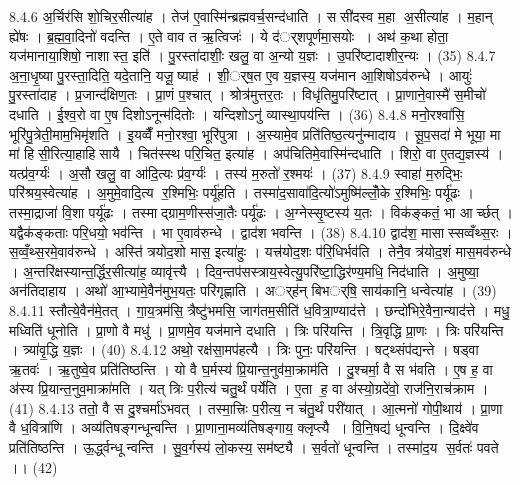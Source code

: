 8.4.6
अ॒र्चिर॑सि शो॒चिर॒सीत्या॑ह । तेज॑ ए॒वास्मि॑न्ब्रह्मवर्च॒सन्द॑धाति । ससी॑दस्व म॒हा अ॒सीत्या॑ह । म॒हान् ह्ये॑षः । ब्र॒ह्म॒वा॒दिनो॑ वदन्ति । ए॒ते वाव त ऋ॒त्विजः॑ । ये द॑र््शपूर्णमा॒सयोः । अथ॑ क॒था होता॒ यज॑मानाया॒शिषो॒ नाशास्त॒ इति॑ । पु॒रस्ता॑दाशीः॒ खलु॒ वा अ॒न्यो य॒ज्ञः । उ॒परि॑ष्टादाशीर॒न्यः । (35)
8.4.7
अ॒ना॒धृ॒ष्या पु॒रस्ता॒दिति॒ यदे॒तानि॒ यजू॒॒ष्याह॑ । शी॒र््ष॒त ए॒व य॒ज्ञस्य॒ यज॑मान आ॒शिषोऽव॑रुन्धे । आयुः॑ पु॒रस्ता॑दाह । प्र॒जान्द॑क्षिण॒तः । प्रा॒णं प॒श्चात् । श्रोत्र॑मुत्तर॒तः । विधृ॑तिमु॒परि॑ष्टात् । प्रा॒णाने॒वास्मै॑ स॒मीचो॑ दधाति । ई॒श्व॒रो वा ए॒ष दिशोऽनून्म॑दितोः । यन्दिशोऽनु॑ व्यास्था॒पय॑न्ति । (36)
8.4.8
मनो॒रश्वा॑सि॒ भूरि॑पु॒त्रेती॒माम॒भिमृ॑शति । इ॒यव्वैँ मनो॒रश्वा॒ भूरि॑पुत्रा । अ॒स्यामे॒व प्रति॑तिष्ठ॒त्यनु॑न्मादाय । सू॒प॒सदा॑ मे भूया॒ मा मा॑ हिसी॒रित्या॒हाहि॑सायै । चित॑स्स्थ परि॒चित॒ इत्या॑ह । अप॑चितिमे॒वास्मि॑न्दधाति । शिरो॒ वा ए॒तद्य॒ज्ञस्य॑ । यत्प्र॑व॒र्ग्यः॑ । अ॒सौ खलु॒ वा आ॑दि॒त्यः प्र॑व॒र्ग्यः॑ । तस्य॑ म॒रुतो॑ र॒श्मयः॑ । (37)
8.4.9
स्वाहा॑ म॒रुद्भिः॒ परि॑श्रय॒स्वेत्या॑ह । अ॒मुमे॒वादि॒त्य र॒श्मिभिः॒ पर्यू॑हति । तस्मा॑द॒सावा॑दि॒त्यो॑ऽमुष्मि॑ल्लोँ॒के र॒श्मिभिः॒ पर्यू॑ढः । तस्मा॒द्राजा॑ वि॒शा पर्यू॑ढः । तस्माद्ग्राम॒णीस्स॑जा॒तैः पर्यू॑ढः । अ॒ग्नेस्सृ॒ष्टस्य॑ य॒तः । विक॑ङ्कतं॒ भा आर्च्छत् । यद्वैक॑ङ्कताः परि॒धयो॒ भव॑न्ति । भा ए॒वाव॑रुन्धे । द्वाद॑श भवन्ति । (38)
8.4.10
द्वाद॑श॒ मासास्सव्वँथ्स॒रः । स॒व्वँ॒थ्स॒रमे॒वाव॑रुन्धे । अस्ति॑ त्रयोद॒शो मास॒ इत्या॑हुः । यत्त्र॑योद॒शः प॑रि॒धिर्भव॑ति । तेनै॒व त्र॑योद॒शं मास॒मव॑रुन्धे । अ॒न्तरि॑क्षस्यान्त॒र्द्धिर॒सीत्या॑ह॒ व्यावृ॑त्त्यै । दिव॒न्तप॑सस्त्राय॒स्वेत्यु॒परि॑ष्टा॒द्धिर॑ण्य॒मधि॒ निद॑धाति । अ॒मुष्या॒ अन॑तिदाहाय । अथो॑ आ॒भ्यामे॒वैन॑मुभ॒यतः॒ परि॑गृह्णाति । अर््ह॑न् बिभर््षि॒ साय॑कानि॒ धन्वेत्या॑ह । (39)
8.4.11
स्तौत्ये॒वैन॑मे॒तत् । गा॒य॒त्रम॑सि॒ त्रैष्टु॑भमसि॒ जाग॑तम॒सीति॑ ध॒वित्रा॒ण्याद॑त्ते । छन्दो॑भिरे॒वैना॒न्याद॑त्ते । मधु॒ मध्विति॑ धूनोति । प्रा॒णो वै मधु॑ । प्रा॒णमे॒व यज॑माने दधाति । त्रिः परि॑यन्ति । त्रि॒वृद्धि प्रा॒णः । त्रिः परि॑यन्ति । त्र्या॑वृ॒द्धि य॒ज्ञः । (40)
8.4.12
अथो॒ रक्ष॑सा॒मप॑हत्यै । त्रिः पुनः॒ परि॑यन्ति । षट्थ्संप॑द्यन्ते । षड्वा ऋ॒तवः॑ । ऋ॒तुष्वे॒व प्रति॑तिष्ठन्ति । यो वै घ॒र्मस्य॑ प्रि॒यान्त॒नुव॑मा॒क्राम॑ति । दु॒श्चर्मा॒ वै स भ॑वति । ए॒ष ह॒ वा अ॑स्य प्रि॒यान्त॒नुव॒माक्रा॑मति । यत् त्रिः प॒रीत्य॑ चतु॒र्थं पर्ये॑ति । ए॒ता ह॒ वा अ॑स्यो॒ग्रदे॑वो॒ राज॑नि॒राच॑क्राम । (41)
8.4.13
ततो॒ वै स दु॒श्चर्मा॑ऽभवत् । तस्मा॒त्त्रिः प॒रीत्य॒ न च॑तु॒र्थं परी॑यात् । आ॒त्मनो॑ गोपी॒थाय॑ । प्रा॒णा वै ध॒वित्रा॑णि । अव्य॑तिषङ्गन्धून्वन्ति । प्रा॒णाना॒मव्य॑तिषङ्गाय॒ क्लृप्त्यै । वि॒नि॒षद्य॑ धून्वन्ति । दि॒क्ष्वे॑व प्रति॑तिष्ठन्ति । ऊ॒र्द्ध्वन्धून्वन्ति । सु॒व॒र्गस्य॑ लो॒कस्य॒ सम॑ष्ट्यै । स॒र्वतो॑ धून्वन्ति । तस्मा॑द॒य स॒र्वतः॑ पवते ।। (42)
